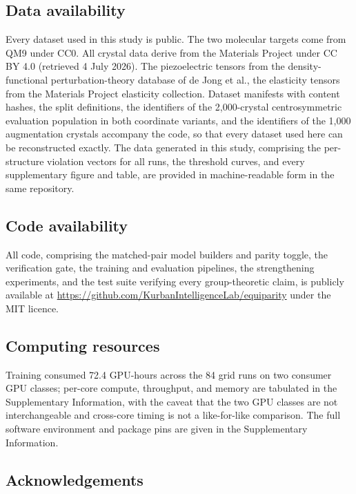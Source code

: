 \subsection*{Data availability}

Every dataset used in this study is public. The two molecular targets come from QM9 under CC0. All crystal data derive from the Materials Project under CC BY 4.0 (retrieved 4 July 2026). The piezoelectric tensors from the density-functional perturbation-theory database of de Jong et al.\cite{dejong2015piezo}, the elasticity tensors from the Materials Project elasticity collection. Dataset manifests with content hashes, the split definitions, the identifiers of the 2,000-crystal centrosymmetric evaluation population in both coordinate variants, and the identifiers of the 1,000 augmentation crystals accompany the code, so that every dataset used here can be reconstructed exactly. The data generated in this study, comprising the per-structure violation vectors for all runs, the threshold curves, and every supplementary figure and table, are provided in machine-readable form in the same repository.

\subsection*{Code availability}

All code, comprising the matched-pair model builders and parity toggle, the verification gate, the training and evaluation pipelines, the strengthening experiments, and the test suite verifying every group-theoretic claim, is publicly available at \url{https://github.com/KurbanIntelligenceLab/equiparity} under the MIT licence.

\subsection*{Computing resources}

Training consumed 72.4 GPU-hours across the 84 grid runs on two consumer GPU classes; per-core compute, throughput, and memory are tabulated in the Supplementary Information, with the caveat that the two GPU classes are not interchangeable and cross-core timing is not a like-for-like comparison. The full software environment and package pins are given in the Supplementary Information.

\subsection*{Acknowledgements}


